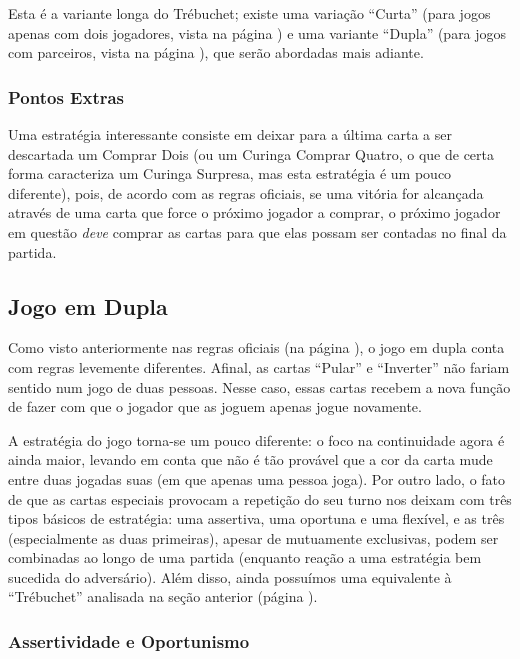 Esta é a variante longa do Trébuchet; existe uma variação ``Curta'' (para jogos apenas com dois jogadores, vista na página \pageref{trebuchetcurto}) e uma variante ``Dupla'' (para jogos com parceiros, vista na página \pageref{trebuchetduplo}), que serão abordadas mais adiante.

\subsubsection{Pontos Extras}

Uma estratégia interessante consiste em deixar para a última carta a ser descartada um Comprar Dois (ou um Curinga Comprar Quatro, o que de certa forma caracteriza um Curinga Surpresa, mas esta estratégia é um pouco diferente), pois, de acordo com as regras oficiais, se uma vitória for alcançada através de uma carta que force o próximo jogador a comprar, o próximo jogador em questão \emph{deve} comprar as cartas para que elas possam ser contadas no final da partida.

\subsection{Jogo em Dupla}

Como visto anteriormente nas regras oficiais (na página \pageref{oficiais}), o jogo em dupla conta com regras levemente diferentes. Afinal, as cartas ``Pular'' e ``Inverter'' não fariam sentido num jogo de duas pessoas. Nesse caso, essas cartas recebem a nova função de fazer com que o jogador que as joguem apenas jogue novamente.

A estratégia do jogo torna-se um pouco diferente: o foco na continuidade agora é ainda maior, levando em conta que não é tão provável que a cor da carta mude entre duas jogadas suas (em que apenas uma pessoa joga). Por outro lado, o fato de que as cartas especiais provocam a repetição do seu turno nos deixam com três tipos básicos de estratégia: uma assertiva, uma oportuna e uma flexível, e as três (especialmente as duas primeiras), apesar de mutuamente exclusivas, podem ser combinadas ao longo de uma partida (enquanto reação a uma estratégia bem sucedida do adversário). Além disso, ainda possuímos uma equivalente à ``Trébuchet'' analisada na seção anterior (página \pageref{trebuchetlongo}).

\subsubsection{Assertividade e Oportunismo}


